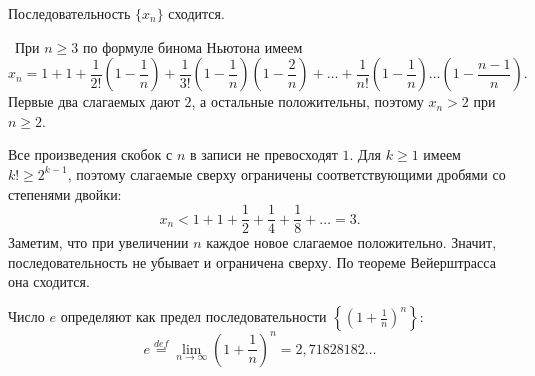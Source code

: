 \begin{theorem}
    Последовательность \(\{x_{n}\}\) сходится.

    \vspace{2mm}

    \proofname~При \(n\geq3\) по формуле бинома Ньютона имеем
    \[x_{n}=1+1+\frac{1}{2!}\left(1-\frac{1}{n}\right)
    +\frac{1}{3!}\left(1-\frac{1}{n}\right)
    \left(1-\frac{2}{n}\right)+\dots+
    \frac{1}{n!}\left(1-\frac{1}{n}\right)\dots
    \left(1-\frac{n-1}{n}\right).\]
    Первые два слагаемых дают \(2\), а остальные положительны, поэтому
    \(x_{n}>2\) при \(n\geq2\).

    Все произведения скобок с \(n\) в записи не превосходят \(1\). Для \(k\geq1\)
    имеем \(k!\geq2^{k-1}\), поэтому слагаемые сверху ограничены
    соответствующими дробями со степенями двойки:
    \[x_{n}<1+1+\frac{1}{2}+\frac{1}{4}+\frac{1}{8}+\dots=3.\]
    Заметим, что при увеличении \(n\) каждое новое слагаемое положительно.
    Значит, последовательность не убывает и ограничена сверху. 
    По теореме Вейерштрасса она сходится.
    ~\qedsymbol
\end{theorem}

\begin{definition}
    Число \(e\) определяют как предел последовательности
    \(\left\{\left(1+\frac{1}{n}\right)^{n}\right\}\):
    \[e\overset{def}{=}\lim\limits_{n\to\infty}
    \left(1+\frac{1}{n}\right)^{n}=2{,}71828182\ldots\]
\end{definition}
